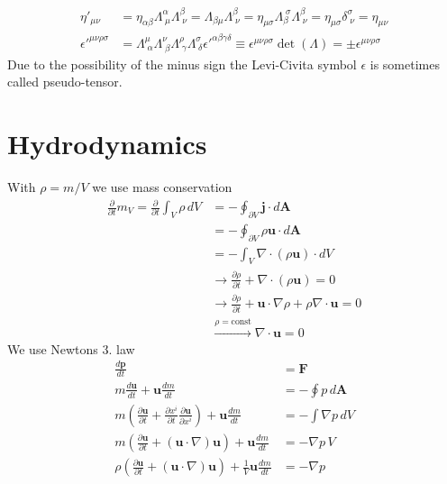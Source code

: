 \documentclass[10pt,a4paper]{book}
\theoremstyle{definition}
\begin{document}
\begin{align}
    \eta'_{\mu\nu} 
    &=\eta_{\alpha\beta}\Lambda^\alpha_{\;\mu} \Lambda^\beta_{\;\nu}
    =\Lambda_{\beta\mu} \Lambda^\beta_{\;\nu}
    =\eta_{\mu\sigma}\Lambda_{\beta}^{\;\sigma} \Lambda^\beta_{\;\nu}
    =\eta_{\mu\sigma}\delta^\sigma_{\;\nu}
    =\eta_{\mu\nu}\\
    {\epsilon'}^{\mu\nu\rho\sigma}
    &=\Lambda^\mu_{\;\alpha}\Lambda^\nu_{\;\beta}\Lambda^\rho_{\;\gamma}\Lambda^\sigma_{\;\delta}{\epsilon'}^{\alpha\beta\gamma\delta}\equiv \epsilon^{\mu\nu\rho\sigma} \det(\Lambda)=\pm \epsilon^{\mu\nu\rho\sigma}
\end{align}
Due to the possibility of the minus sign the Levi-Civita symbol $\epsilon$ is sometimes called pseudo-tensor.

\section{Hydrodynamics}
With $\rho=m/V$ we use mass conservation
\begin{align}
\frac{\partial}{\partial t}m_V
=\frac{\partial}{\partial t}\int_V \rho\,dV
&=-\oint_{\partial V} \mathbf{j}\cdot d\mathbf{A}\\
&=-\oint_{\partial V} \rho\mathbf{u}\cdot d\mathbf{A}\\
&=-\int_V \nabla\cdot(\rho\mathbf{u})\cdot dV\\
&\rightarrow\frac{\partial\rho}{\partial t}+\nabla\cdot(\rho\mathbf{u})=0\\
&\rightarrow\frac{\partial\rho}{\partial t}+\mathbf{u}\cdot\nabla\rho+\rho\nabla\cdot\mathbf{u}=0\\
&\overset{\rho=\text{const}}{\rightarrow}\nabla\cdot\mathbf{u}=0
\end{align}
We use Newtons 3. law
\begin{align}
\frac{d\mathbf{p}}{dt}&=\mathbf{F}\\
m\frac{d\mathbf{u}}{dt}+\mathbf{u}\frac{dm}{dt}&=-\oint p\,d\mathbf{A}\\
m\left(\frac{\partial\mathbf{u}}{\partial t}+\frac{\partial x^i}{\partial t}\frac{\partial\mathbf{u}}{\partial x^i}\right)+\mathbf{u}\frac{dm}{dt}&=-\int \nabla p\,dV\\
m\left(\frac{\partial\mathbf{u}}{\partial t}+(\mathbf{u}\cdot\nabla)\mathbf{u}\right)+\mathbf{u}\frac{dm}{dt}&=-\nabla p\,V\\
\rho\left(\frac{\partial\mathbf{u}}{\partial t}+(\mathbf{u}\cdot\nabla)\mathbf{u}\right)+\frac{1}{V}\mathbf{u}\frac{dm}{dt}&=-\nabla p
\end{align}
\end{document}
